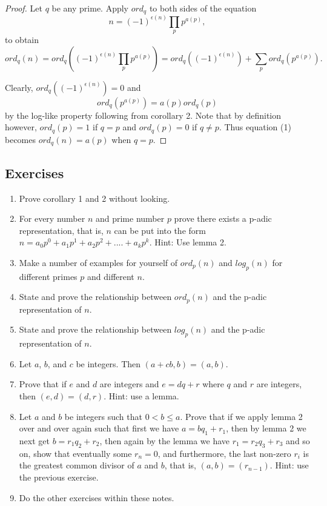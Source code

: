 \documentclass{article}
\theoremstyle{problemstyle}
\begin{document}
\begin{proof}
Let $q$ be any prime. Apply $ord_q$ to both sides of the equation
\begin{equation*}n = (-1)^{\epsilon(n)}\prod_pp^{a(p)}, \end{equation*} 
to obtain 
\setcounter{equation}{0}
\begin{equation}ord_q(n) = ord_q((-1)^{\epsilon(n)}\prod_pp^{a(p)}) = ord_q((-1)^{\epsilon(n)})+ \sum_pord_q(p^{a(p)}).  \end{equation} 

Clearly, $ord_q((-1)^{\epsilon(n)}) = 0$ and $$ord_q(p^{a(p)}) = a(p)ord_q(p)$$ by the log-like property following from corollary 2. Note that by definition however,  $ord_q(p) = 1$ if $q = p$ and $ord_q(p) = 0$ if $q \neq p$. Thus
equation (1) becomes $ord_q(n) = a(p)$ when $q = p$. 
\end{proof}

\subsection*{Exercises}
\begin{enumerate}
\item Prove corollary 1 and 2 without looking. 
\item For every number $n$ and prime number $p$ prove there exists a p-adic representation, that is, $n$ can be put into the form $n = a_0p^0+a_1p^1 + a_2p^2+....+a_kp^k$. Hint: Use lemma 2. 
\item Make a number of examples for yourself of $ord_p(n)$ and $log_p(n)$ for different primes $p$ and different $n$. 
\item State and prove the relationship between $ord_p(n)$ and the p-adic representation of $n$. 
\item State and prove the relationship between $log_p(n)$ and the p-adic representation of $n$. 
\item Let $a$, $b$, and $c$ be integers. Then $(a+cb,b) = (a,b)$.
\item Prove that if $e$ and $d$ are integers and $e = dq+r$ where $q$ and $r$ are integers, then $(e,d) = (d,r)$. Hint: use a lemma. 
\item Let $a$ and $b$ be integers such that $0 < b \leq a$. Prove that if we apply lemma 2 over and over again such that first we have $a = bq_1 + r_1$, then by lemma 2 we next get $b = r_1q_2+r_2$, then again by the lemma we have $r_1 = r_2q_3 + r_3$ and so on, show that eventually some $r_n = 0$, and furthermore, the last non-zero $r_i$ is the greatest common divisor of $a$ and $b$, that is, $(a,b) = (r_{n-1})$. Hint: use the previous exercise.   
\item Do the other exercises within these notes. 

\end{enumerate}
\end{document}
